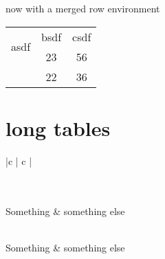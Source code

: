 \documentclass[12pt]{report}
\begin{document}
now with a merged row environment
\begin{center}
\begin{tabular}{||| c | c | c ||} %
\hline 
\multirow{2}{4em}{asdf} & bsdf & csdf \\
 & 23 & 56 \\ 
 \hline
 & 22 & 36 \\ 
 \hline
\end{tabular}
\end{center}

\pagebreak 

\section{long tables}
\begin{longtable}[c]{|c | c |}
\caption{test}\\
 \hline
 \\
 \hline
 Something & something else\\
 \hline
 \endfirsthead

 \hline
 \\
 \hline
 Something & something else\\
 \hline
 \endhead

  \hline
 \endfoot


\end{longtable}
\end{document}
